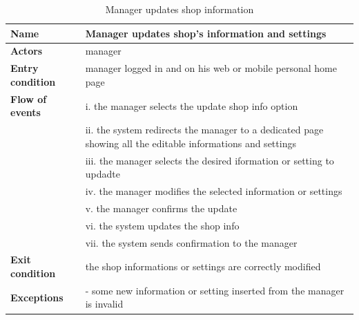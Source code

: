 \begin{table}[h!]
    \centering
    \begin{tabular}{@{}P{0.2\textwidth}P{0.70\textwidth}@{}}
        \toprule
        \textbf{Name}                 & Manager updates shop's information and settings\\
        \midrule
        \textbf{Actors}               & manager\\
        \textbf{Entry condition}      & manager logged in and on his web or mobile personal home page\\
        \textbf{Flow of events}            
        & i. the manager selects the update shop info option\\
        & ii. the system redirects the manager to a dedicated page showing all the editable informations and settings\\
        & iii. the manager selects the desired iformation or setting to updadte\\
        & iv. the manager modifies the selected information or settings\\
        & v. the manager confirms the update\\
        & vi. the system updates the shop info\\
        & vii. the system sends confirmation to the manager\\
        \textbf{Exit condition}       & the shop informations or settings are correctly modified\\
        \textbf{Exceptions}           
        & - some new information or setting inserted from the manager is invalid\\
        \bottomrule
    \end{tabular}
\caption{Manager updates shop information}
\label{table:managerupdatesshopinformation}
\end{table}

